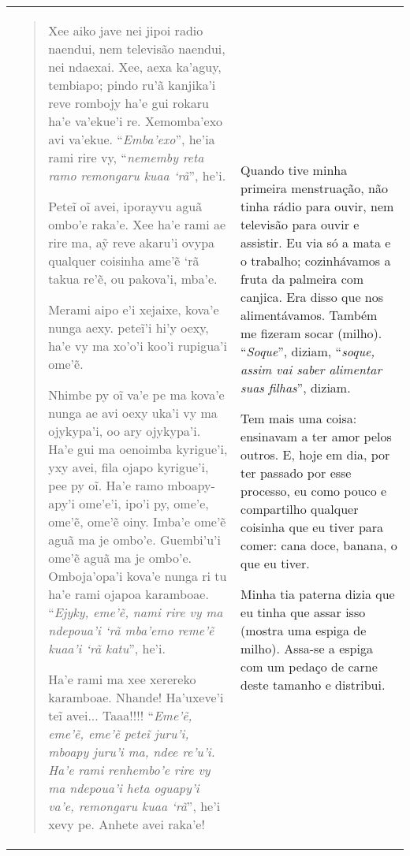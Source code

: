 \begin{longtable}[]{@{}ll@{}}
\toprule
\begin{minipage}[t]{0.48\columnwidth}\raggedright\strut
\begin{quote}
Xee aiko jave nei jipoi radio naendui, nem televisão naendui, nei
ndaexai. Xee, aexa ka'aguy, tembiapo; pindo ru'ã kanjika'i reve rombojy
ha'e gui rokaru ha'e va'ekue'i re. Xemomba'exo avi va'ekue.
``\emph{Emba'exo}'', he'ia rami rire vy, ``\emph{nememby reta ramo
remongaru kuaa `rã}'', he'i.

Peteĩ oĩ avei, iporayvu aguã ombo'e raka'e. Xee ha'e rami ae rire ma, aỹ
reve akaru'i ovypa qualquer coisinha ame'ẽ `rã takua re'ẽ, ou pakova'i,
mba'e.

Merami aipo e'i xejaixe, kova'e nunga aexy. peteĩ'i hi'y oexy, ha'e vy
ma xo'o'i koo'i rupigua'i ome'ẽ.

Nhimbe py oĩ va'e pe ma kova'e nunga ae avi oexy uka'i vy ma ojykypa'i,
oo ary ojykypa'i. Ha'e gui ma oenoimba kyrigue'i, yxy avei, fila ojapo
kyrigue'i, pee py oĩ. Ha'e ramo mboapy-apy'i ome'e'i, ipo'i py, ome'e,
ome'ẽ, ome'ẽ oiny. Imba'e ome'ẽ aguã ma je ombo'e. Guembi'u'i ome'ẽ aguã
ma je ombo'e. Omboja'opa'i kova'e nunga ri tu ha'e rami ojapoa
karamboae. ``\emph{Ejyky, eme'ẽ, nami rire vy ma ndepoua'i `rã mba'emo
reme'ẽ kuaa'i `rã katu}'', he'i.

Ha'e rami ma xee xerereko karamboae. Nhande! Ha'uxeve'i teĩ avei...
Taaa!!!! ``\emph{Eme'ẽ, eme'ẽ, eme'ẽ peteĩ juru'i, mboapy juru'i ma,
ndee re'u'i. Ha'e rami renhembo'e rire vy ma ndepoua'i heta oguapy'i
va'e, remongaru kuaa `rã}'', he'i xevy pe. Anhete avei raka'e!
\end{quote}\strut
\end{minipage} & \begin{minipage}[t]{0.48\columnwidth}\raggedright\strut
Quando tive minha primeira menstruação, não tinha rádio para ouvir, nem
televisão para ouvir e assistir. Eu via só a mata e o trabalho;
cozinhávamos a fruta da palmeira com canjica. Era disso que nos
alimentávamos. Também me fizeram socar (milho). ``\emph{Soque}'',
diziam, ``\emph{soque, assim vai saber alimentar suas filhas}'', diziam.

Tem mais uma coisa: ensinavam a ter amor pelos outros. E, hoje em dia,
por ter passado por esse processo, eu como pouco e compartilho qualquer
coisinha que eu tiver para comer: cana doce, banana, o que eu tiver.

Minha tia paterna dizia que eu tinha que assar isso (mostra uma espiga
de milho). Assa-se a espiga com um pedaço de carne deste tamanho e
distribui.


\end{minipage}
\end{longtable}
